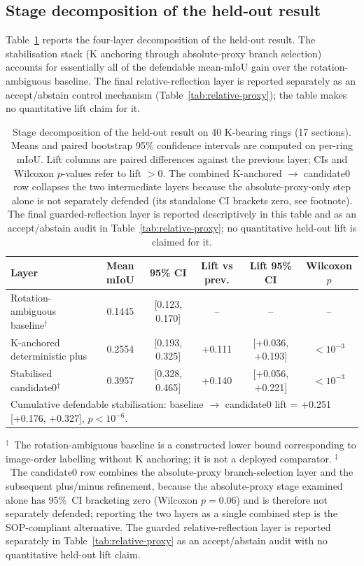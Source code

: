 \documentclass[a4paper,fleqn]{cas-dc}
\begin{document}
\subsection{Stage decomposition of the held-out result}\label{sec:main-results}

Table~\ref{tab:stage-decomposition} reports the four-layer decomposition of the held-out result. The stabilisation stack (K anchoring through absolute-proxy branch selection) accounts for essentially all of the defendable mean-mIoU gain over the rotation-ambiguous baseline. The final relative-reflection layer is reported separately as an accept/abstain control mechanism (Table~\ref{tab:relative-proxy}); the table makes no quantitative lift claim for it.

\begin{table}[!t]
\caption{Stage decomposition of the held-out result on 40 K-bearing rings (17 sections). Means and paired bootstrap 95\% confidence intervals are computed on per-ring mIoU. Lift columns are paired differences against the previous layer; CIs and Wilcoxon $p$-values refer to lift $>0$. The combined K-anchored $\to$ candidate0 row collapses the two intermediate layers because the absolute-proxy-only step alone is not separately defended (its standalone CI brackets zero, see footnote). The final guarded-reflection layer is reported descriptively in this table and as an accept/abstain audit in Table~\ref{tab:relative-proxy}; no quantitative held-out lift is claimed for it.}
\label{tab:stage-decomposition}
\centering
\small
\begin{tabular}{lccccc}
\toprule
Layer & Mean mIoU & 95\% CI & Lift vs prev. & Lift 95\% CI & Wilcoxon $p$ \\
\midrule
Rotation-ambiguous baseline$^{\dagger}$  & 0.1445 & [0.123, 0.170] & --      & --                 & -- \\
K-anchored deterministic plus            & 0.2554 & [0.193, 0.325] & +0.111  & [+0.036, +0.193]   & $<10^{-3}$ \\
Stabilised candidate0$^{\ddagger}$        & 0.3957 & [0.328, 0.465] & +0.140  & [+0.056, +0.221]   & $<10^{-3}$ \\
\midrule
\multicolumn{6}{l}{Cumulative defendable stabilisation: baseline $\to$ candidate0 lift = +0.251 [+0.176, +0.327], $p<10^{-6}$.} \\
\bottomrule
\end{tabular}
\vspace{2pt}
{\footnotesize $^{\dagger}$~The rotation-ambiguous baseline is a constructed lower bound corresponding to image-order labelling without K anchoring; it is not a deployed comparator. $^{\ddagger}$~The candidate0 row combines the absolute-proxy branch-selection layer and the subsequent plus/minus refinement, because the absolute-proxy stage examined alone has 95\%~CI bracketing zero (Wilcoxon $p=0.06$) and is therefore not separately defended; reporting the two layers as a single combined step is the SOP-compliant alternative. The guarded relative-reflection layer is reported separately in Table~\ref{tab:relative-proxy} as an accept/abstain audit with no quantitative held-out lift claim.}
\end{table}
\end{document}
